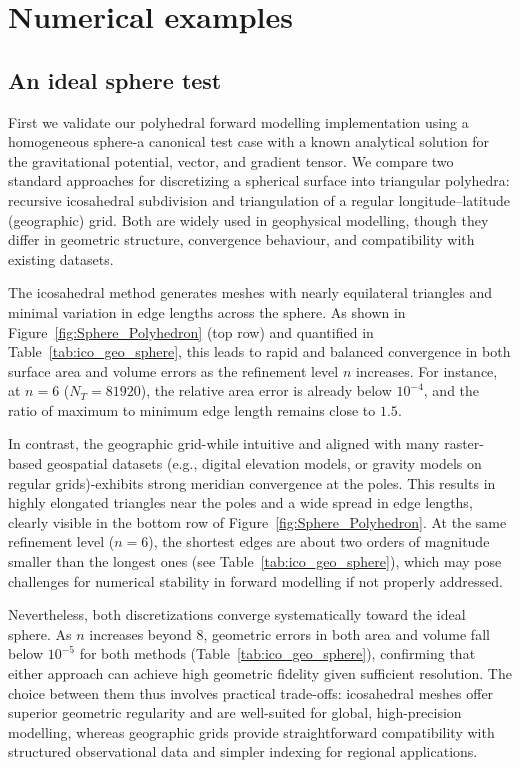 \documentclass{seg}
\begin{document}
\section*{Numerical examples}

\subsection*{An ideal sphere test}

First we validate our polyhedral forward modelling implementation using a homogeneous sphere-a canonical test case with a known analytical solution for the gravitational potential, vector, and gradient tensor. We compare two standard approaches for discretizing a spherical surface into triangular polyhedra: recursive icosahedral subdivision \citep{Zhang2018JGeod} and triangulation of a regular longitude--latitude (geographic) grid. Both are widely used in geophysical modelling, though they differ in geometric structure, convergence behaviour, and compatibility with existing datasets.

The icosahedral method generates meshes with nearly equilateral triangles and minimal variation in edge lengths across the sphere. As shown in Figure~\ref{fig:Sphere_Polyhedron} (top row) and quantified in Table~\ref{tab:ico_geo_sphere}, this leads to rapid and balanced convergence in both surface area and volume errors as the refinement level $n$ increases. For instance, at $n=6$ ($N_T = 81920$), the relative area error is already below $10^{-4}$, and the ratio of maximum to minimum edge length remains close to $1.5$.

In contrast, the geographic grid-while intuitive and aligned with many raster-based geospatial datasets (e.g., digital elevation models, or gravity models on regular grids)-exhibits strong meridian convergence at the poles. This results in highly elongated triangles near the poles and a wide spread in edge lengths, clearly visible in the bottom row of Figure~\ref{fig:Sphere_Polyhedron}. At the same refinement level ($n=6$), the shortest edges are about two orders of magnitude smaller than the longest ones (see Table~\ref{tab:ico_geo_sphere}), which may pose challenges for numerical stability in forward modelling if not properly addressed.

Nevertheless, both discretizations converge systematically toward the ideal sphere. As $n$ increases beyond 8, geometric errors in both area and volume fall below $10^{-5}$ for both methods (Table~\ref{tab:ico_geo_sphere}), confirming that either approach can achieve high geometric fidelity given sufficient resolution. The choice between them thus involves practical trade-offs: icosahedral meshes offer superior geometric regularity and are well-suited for global, high-precision modelling, whereas geographic grids provide straightforward compatibility with structured observational data and simpler indexing for regional applications.
\end{document}
